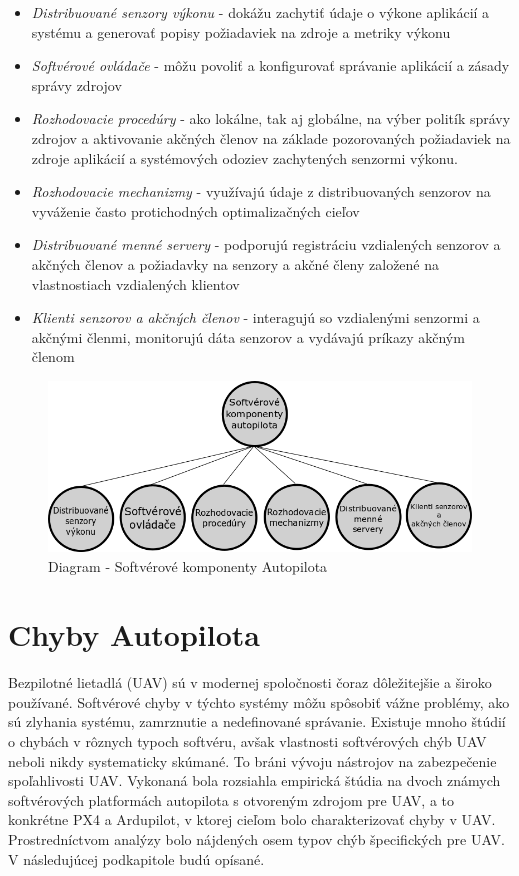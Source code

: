 \documentclass[10pt,twoside,slovak,a4paper]{article}
\begin{document}
\begin{itemize}
\item \emph{Distribuované senzory výkonu} - dokážu zachytiť údaje o výkone aplikácií a systému a generovať popisy požiadaviek na zdroje a metriky výkonu
\item \emph{Softvérové ovládače} - môžu povoliť a konfigurovať správanie aplikácií a zásady správy zdrojov
\item \emph{Rozhodovacie procedúry} - ako lokálne, tak aj globálne, na výber politík správy zdrojov a aktivovanie akčných členov na základe pozorovaných požiadaviek na zdroje aplikácií a systémových odoziev zachytených senzormi výkonu.
\item \emph{Rozhodovacie mechanizmy} - využívajú údaje z distribuovaných senzorov na vyváženie často protichodných optimalizačných cieľov
\item \emph{Distribuované menné servery} - podporujú registráciu vzdialených senzorov a akčných členov a požiadavky na senzory a akčné členy založené na vlastnostiach vzdialených klientov
\item \emph{Klienti senzorov a akčných členov} - interagujú so vzdialenými senzormi a akčnými členmi, monitorujú dáta senzorov a vydávajú príkazy akčným členom \cite{SoftverAutopilot}
\end{itemize}

\begin{figure}[tbh]
\centering
\includegraphics[scale=0.40]{diagram.png}
\caption{Diagram - Softvérové komponenty Autopilota\cite{SoftverAutopilot}}
\label{f:diagram}
\end{figure}

\section{Chyby Autopilota} \label{chyby}

Bezpilotné lietadlá (UAV) sú v modernej spoločnosti čoraz dôležitejšie a široko používané. Softvérové chyby v týchto systémy môžu spôsobiť vážne problémy, ako sú zlyhania systému, zamrznutie a nedefinované správanie. Existuje mnoho štúdií o chybách v rôznych typoch softvéru, avšak vlastnosti softvérových chýb UAV neboli nikdy systematicky skúmané. To bráni vývoju nástrojov na zabezpečenie spoľahlivosti UAV. Vykonaná bola rozsiahla empirická štúdia na dvoch známych softvérových platformách autopilota s otvoreným zdrojom pre UAV, a to konkrétne PX4 a Ardupilot, v ktorej cieľom bolo charakterizovať chyby v UAV. Prostredníctvom analýzy bolo nájdených osem typov chýb špecifických pre UAV. V následujúcej podkapitole budú opísané.\cite{chybyautopilot}
\end{document}
